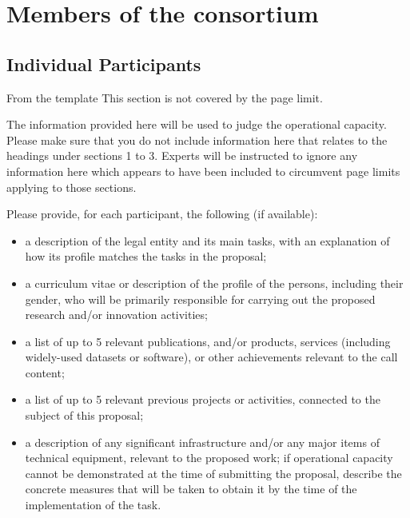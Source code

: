 \chapter{Members of the consortium}

\section{Individual Participants}\label{sec:partners}

\begin{todo}{From the template}
This section is not covered by the page limit.

The information provided here will be used to judge the operational capacity. Please make sure that you do not include information here that relates to the headings under sections 1 to 3. Experts will be instructed to ignore any information here which appears to have been included to circumvent page limits applying to those sections.

Please provide, for each participant, the following (if available):
\begin{itemize}
\item a description of the legal entity and its main tasks, with an explanation of how its profile matches the tasks in the proposal;
\item a curriculum vitae or description of the profile of the persons, including their gender, who will be primarily responsible for carrying out the proposed research and/or innovation activities;
\item a list of up to 5 relevant publications, and/or products, services (including widely-used datasets or software), or other achievements relevant to the  call content;
\item a list of up to 5 relevant previous projects or activities, connected to the subject of this proposal;
\item a description of any significant infrastructure and/or any major items of technical equipment, relevant to the proposed work;
if operational capacity cannot be demonstrated at the time of submitting the proposal, describe the concrete measures that will be taken to obtain it by the time of the implementation of the task.
\end{itemize}
\end{todo}

